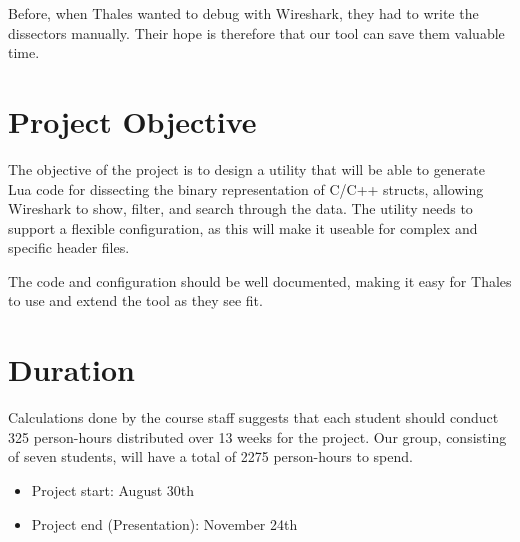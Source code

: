 Before, when Thales wanted to debug with Wireshark, they had to write the dissectors manually. Their hope is therefore that our tool can save them valuable time.


\section{Project Objective}
The objective of the project is to design a utility that will be able to generate Lua code for dissecting the binary representation of C/C++ structs, allowing Wireshark to show, filter, and search through the data.
The utility needs to support a flexible configuration, as this will make it useable for complex and specific header files. 

The code and configuration should be well documented, making it easy for Thales to use and extend the tool as they see fit.


\section{Duration}
Calculations done by the course staff suggests that each student should conduct 325 person-hours distributed over 13 weeks for the project. Our group, consisting of seven students, will have a total of 2275 person-hours to spend.\\
\begin {itemize}
	\item Project start: August 30th
	\item Project end (Presentation): November 24th
\end{itemize}


